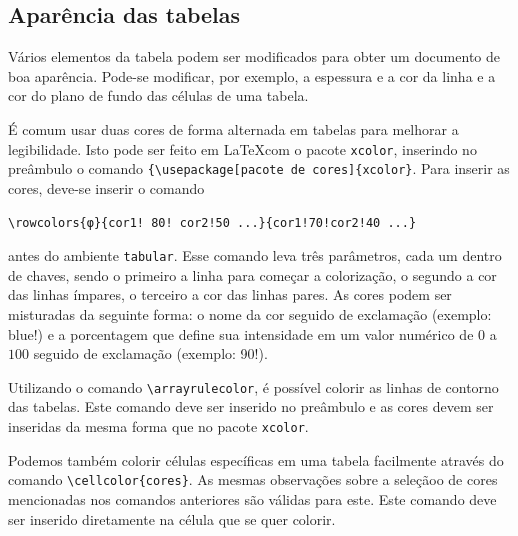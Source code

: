 \subsection{Aparência das tabelas}
V\'arios elementos da tabela podem ser modificados para obter um documento de boa apar\^encia. Pode-se modificar, por exemplo, a espessura e a cor da linha e a cor do plano de fundo das c\'elulas de uma tabela. 

\noindent \'E comum usar duas cores de forma alternada em tabelas para melhorar a legibilidade. Isto pode ser feito em \LaTeX com o pacote \texttt{xcolor}, inserindo no pre\^ambulo o comando \verb|{\usepackage[pacote de cores]{xcolor}|. Para inserir as cores, deve-se inserir o comando

\begin{center}
\verb|\rowcolors{φ}{cor1! 80! cor2!50 ...}{cor1!70!cor2!40 ...}| 
\end{center}

\noindent antes do ambiente \texttt{tabular}. Esse comando leva tr\^es par\^ametros, cada um dentro de chaves, sendo o primeiro a linha para come\c car a coloriza\c c\~ao, o segundo a cor das linhas \'impares, o terceiro a cor das linhas pares. As cores podem ser misturadas da seguinte forma: o nome da cor seguido de exclama\c c\~ao (exemplo: blue!) e a porcentagem que define sua intensidade em um valor numérico de $0$ a $100$ seguido de exclama\c c\~ao (exemplo: 90!).



\noindent Utilizando o comando \verb|\arrayrulecolor|, \'e poss\'ivel colorir as linhas de contorno das tabelas. Este comando deve ser inserido no pre\^ambulo e as cores devem ser inseridas da mesma forma que no pacote \verb|xcolor|.

\noindent Podemos tamb\'em colorir c\'elulas espec\'ificas em uma tabela facilmente atrav\'es do comando \verb|\cellcolor{cores}|. As mesmas observações sobre a sele\c c\~aoo de cores mencionadas nos comandos anteriores são v\'alidas para este. Este comando deve ser inserido diretamente na c\'elula que se quer colorir.

